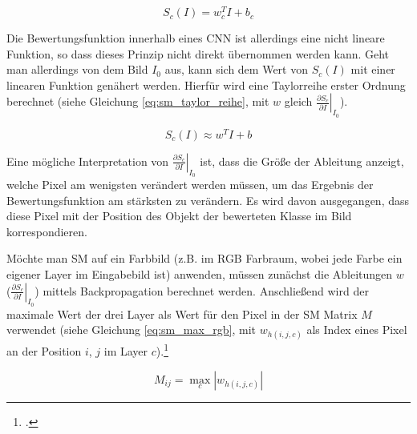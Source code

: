 \begin{equation}
    \label{eq:am_lin_bf}
    S_{c}(I)=w_{c}^{T} I+b_{c}
\end{equation}

Die Bewertungsfunktion innerhalb eines \ac{CNN} ist allerdings eine nicht lineare Funktion, so dass dieses Prinzip nicht direkt übernommen werden kann. Geht man allerdings von dem Bild $I_0$ aus, kann sich dem Wert von $S_c(I)$ mit einer linearen Funktion genähert werden. Hierfür wird eine Taylorreihe erster Ordnung berechnet (siehe Gleichung \ref{eq:sm_taylor_reihe}, mit $w$ gleich $\left.\frac{\partial S_{c}}{\partial I}\right|_{I_{0}}$).

\begin{equation}
    \label{eq:sm_taylor_reihe}
    S_{c}(I) \approx w^{T} I+b
\end{equation}

Eine mögliche Interpretation von $\left.\frac{\partial S_{c}}{\partial I}\right|_{I_{0}}$ ist, dass die Größe der Ableitung anzeigt, welche Pixel am wenigsten verändert werden müssen, um das Ergebnis der Bewertungsfunktion am stärksten zu verändern. Es wird davon ausgegangen, dass diese Pixel mit der Position des Objekt der bewerteten Klasse im Bild korrespondieren.

Möchte man \ac{SM} auf ein Farbbild (z.B. im \ac{RGB} Farbraum, wobei jede Farbe ein eigener Layer im Eingabebild ist) anwenden, müssen zunächst die Ableitungen $w$ ($\left.\frac{\partial S_{c}}{\partial I}\right|_{I_{0}}$) mittels Backpropagation berechnet werden. Anschließend wird der maximale Wert der drei Layer als Wert für den Pixel in der \ac{SM} Matrix $M$ verwendet (siehe Gleichung \ref{eq:sm_max_rgb}, mit $w_{h(i,j,c)}$ als Index eines Pixel an der Position $i$, $j$ im Layer $c$).\footcite[Vgl.][S. 3f.]{simonyanDeepConvolutionalNetworks2014}

\begin{equation}
    \label{eq:sm_max_rgb}
    M_{i j}=\max _{c}\left|w_{h(i, j, c)}\right|
\end{equation}


